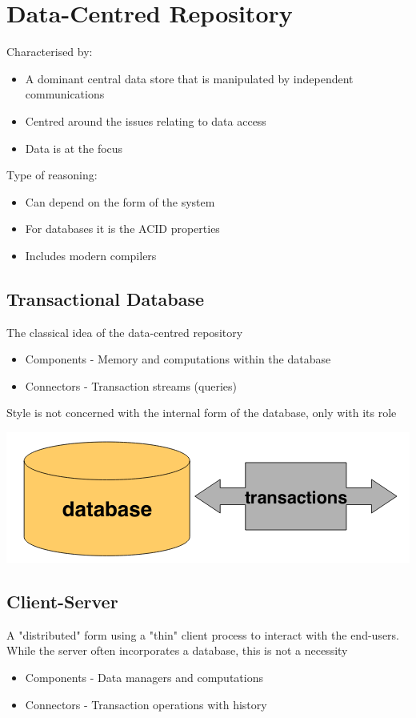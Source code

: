 \documentclass{article}[18pt]
\begin{document}
\section{Data-Centred Repository}
Characterised by:
\begin{itemize}
	\item A dominant central data store that is manipulated by independent communications
	\item Centred around the issues relating to data access 
	\item Data is at the focus
\end{itemize}
Type of reasoning:
\begin{itemize}
	\item Can depend on the form of the system
	\item For databases it is the ACID properties
	\item Includes modern compilers
\end{itemize}
\subsection{Transactional Database}
The classical idea of the data-centred repository
\begin{itemize}
	\item Components - Memory and computations within the database
	\item Connectors - Transaction streams (queries)
\end{itemize}
Style is not concerned with the internal form of the database, only with its role
\begin{center}
	\includegraphics[scale=0.7]{"Transactional Database"}
\end{center}
\subsection{Client-Server}
A "distributed" form using a "thin" client process to interact with the end-users. While the server often incorporates a database, this is not a necessity
\begin{itemize}
	\item Components - Data managers and computations
	\item Connectors - Transaction operations with history
\end{itemize}
\end{document}
